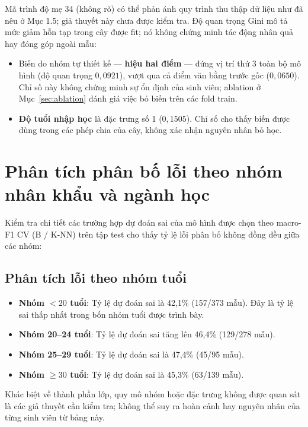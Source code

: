 Mã trình độ mẹ 34 (không rõ) có thể phản ánh quy trình thu thập dữ liệu như đã nêu ở Mục 1.5; giả thuyết này chưa được kiểm tra. Độ quan trọng Gini mô tả mức giảm hỗn tạp trong cây được fit; nó không chứng minh tác động nhân quả hay đóng góp ngoài mẫu:
\begin{itemize}
    \item Biến do nhóm tự thiết kế — \textbf{hiệu hai điểm} — đứng vị trí thứ 3 toàn bộ mô hình (độ quan trọng $0{,}0921$), vượt qua cả điểm văn bằng trước gốc ($0{,}0650$). Chỉ số này không chứng minh sự ổn định của sinh viên; ablation ở Mục~\ref{sec:ablation} đánh giá việc bỏ biến trên các fold train.
    \item \textbf{Độ tuổi nhập học} là đặc trưng số 1 ($0{,}1505$). Chỉ số cho thấy biến được dùng trong các phép chia của cây, không xác nhận nguyên nhân bỏ học.
\end{itemize}

\section{Phân tích phân bố lỗi theo nhóm nhân khẩu và ngành học}
Kiểm tra chi tiết các trường hợp dự đoán sai của mô hình được chọn theo macro-F1 CV (B / K-NN) trên tập test cho thấy tỷ lệ lỗi phân bố không đồng đều giữa các nhóm:

\subsection{Phân tích lỗi theo nhóm tuổi}
\begin{itemize}
    \item \textbf{Nhóm $< 20$ tuổi}: Tỷ lệ dự đoán sai là 42,1\% (157/373 mẫu). Đây là tỷ lệ sai thấp nhất trong bốn nhóm tuổi được trình bày.
    \item \textbf{Nhóm 20--24 tuổi}: Tỷ lệ dự đoán sai tăng lên 46,4\% (129/278 mẫu).
    \item \textbf{Nhóm 25--29 tuổi}: Tỷ lệ dự đoán sai là 47,4\% (45/95 mẫu).
    \item \textbf{Nhóm $\ge 30$ tuổi}: Tỷ lệ dự đoán sai là 45,3\% (63/139 mẫu).
\end{itemize}
Khác biệt về thành phần lớp, quy mô nhóm hoặc đặc trưng không được quan sát là các giả thuyết cần kiểm tra; không thể suy ra hoàn cảnh hay nguyên nhân của từng sinh viên từ bảng này.

